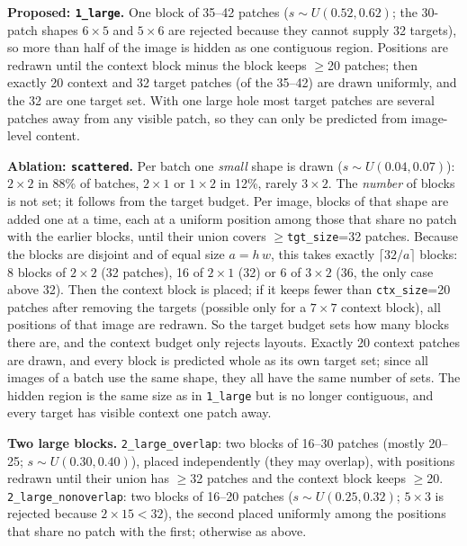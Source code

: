\documentclass[10pt]{article}
\begin{document}
\textbf{Proposed: \texttt{1\_large}.} One block of 35--42 patches ($s\sim U(0.52,0.62)$; the 30-patch shapes $6{\times}5$ and
$5{\times}6$ are rejected because they cannot supply 32 targets), so more than half of the image is hidden as one
contiguous region. Positions are redrawn until the context block minus the block keeps $\ge$20 patches; then exactly 20
context and 32 target patches (of the 35--42) are drawn uniformly, and the 32 are one target set. With one large hole most
target patches are several patches away from any visible patch, so they can only be predicted from image-level content.

\textbf{Ablation: \texttt{scattered}.} Per batch one \emph{small} shape is drawn ($s\sim U(0.04,0.07)$): $2{\times}2$ in 88\%
of batches, $2{\times}1$ or $1{\times}2$ in 12\%, rarely $3{\times}2$. The \emph{number} of blocks is not set; it follows from the
target budget. Per image, blocks of that shape are added one at a time, each at a uniform position among those that share no
patch with the earlier blocks, until their union covers $\ge$\texttt{tgt\_size}=32 patches. Because the blocks are disjoint
and of equal size $a=h\,w$, this takes exactly $\lceil 32/a\rceil$ blocks: 8 blocks of $2{\times}2$ (32 patches), 16 of
$2{\times}1$ (32) or 6 of $3{\times}2$ (36, the only case above 32). Then the context block is placed; if it keeps fewer than
\texttt{ctx\_size}=20 patches after removing the targets (possible only for a $7{\times}7$ context block), all positions of
that image are redrawn. So the target budget sets how many blocks there are, and the context budget only rejects layouts.
Exactly 20 context patches are drawn, and every block is predicted whole as its own target set; since all images of a batch
use the same shape, they all have the same number of sets. The hidden region is the same size as in \texttt{1\_large} but
is no longer contiguous, and every target has visible context one patch away.

\textbf{Two large blocks.} \texttt{2\_large\_overlap}: two blocks of 16--30 patches (mostly 20--25; $s\sim U(0.30,0.40)$),
placed independently (they may overlap), with positions redrawn until their union has $\ge$32 patches and the context block
keeps $\ge$20. 
\texttt{2\_large\_nonoverlap}: two blocks of 16--20 patches ($s\sim U(0.25,0.32)$; $5{\times}3$ is rejected because
$2{\times}15<32$), the second placed uniformly among the positions that share no patch with the first; otherwise as above.
\end{document}
